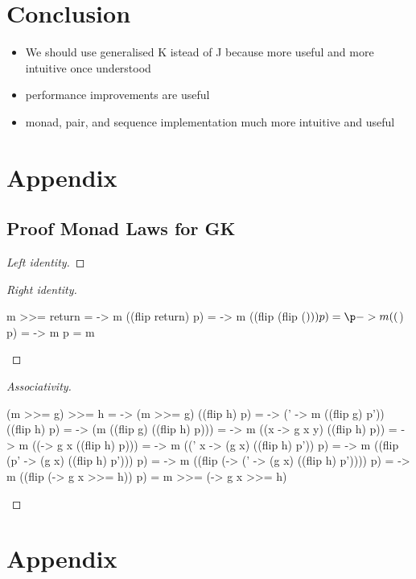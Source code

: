\documentclass[runningheads]{llncs}
\providecommand{\tightlist}{%
  \setlength{\itemsep}{0pt}\setlength{\parskip}{0pt}}
\begin{document}
\section{Conclusion}\label{conclusion}

\begin{itemize}
\tightlist
\item
  We should use generalised K istead of J because more useful and more
  intuitive once understood
\item
  performance improvements are useful
\item
  monad, pair, and sequence implementation much more intuitive and
  useful
\end{itemize}

\section{Appendix}\label{appendix}

\subsection{Proof Monad Laws for GK}\label{proof-monad-laws-for-gk}

\begin{proof}[Left identity]
\end{proof}

\begin{proof}[Right identity]
\begin{haskell}
m >>= return 
= \p -> m ((flip return) p)
= \p -> m ((flip (flip ($))) p)
= \p -> m (($) p)
= \p -> m p
= m 
\end{haskell}
\end{proof}

\begin{proof}[Associativity]
\begin{haskell}
(m >>= g) >>= h 
= \p -> (m >>= g) ((flip h) p)
= \p -> (\p' -> m ((flip g) p')) ((flip h) p)
= \p -> (m ((flip g) ((flip h) p))) 
= \p -> m ((\y x -> g x y) ((flip h) p))
= \p -> m ((\x -> g x ((flip h) p)))
= \p -> m ((\p' x -> (g x) ((flip h) p')) p)
= \p -> m ((flip (\x p' -> (g x) ((flip h) p'))) p)
= \p -> m ((flip (\x -> (\p' -> (g x) ((flip h) p')))) p)
= \p -> m ((flip (\x -> g x >>= h)) p)
= m >>= (\x -> g x >>= h)
\end{haskell}
\end{proof}

%
%
%
% 
% 
%



\newpage
\section*{Appendix}
\appendix
\end{document}
